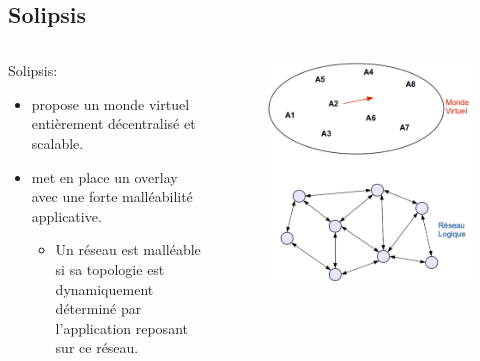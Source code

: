 \documentclass{beamer}
\begin{document}
  \subsection{Solipsis}

  \begin{frame}
	\begin{columns}
          \begin{column}{6cm}
	Solipsis:\\
	\begin{itemize}
		\item propose un monde virtuel entièrement décentralisé et scalable.\\
		\item met en place un overlay avec une forte malléabilité applicative.\\
		\tiny{
			\begin{itemize}
				\item Un réseau est malléable si sa topologie est dynamiquement déterminé par l'application reposant sur ce réseau.\\
			\end{itemize}
		}
	\end{itemize}
	\end{column}
        \begin{column}{4cm}
        \begin{figure}
        \includegraphics[scale=0.1]{./Ressources/Images/OverlayMalle_et1.png}\\

\end{figure}
\end{column}
\end{columns}
\end{frame}
\end{document}
